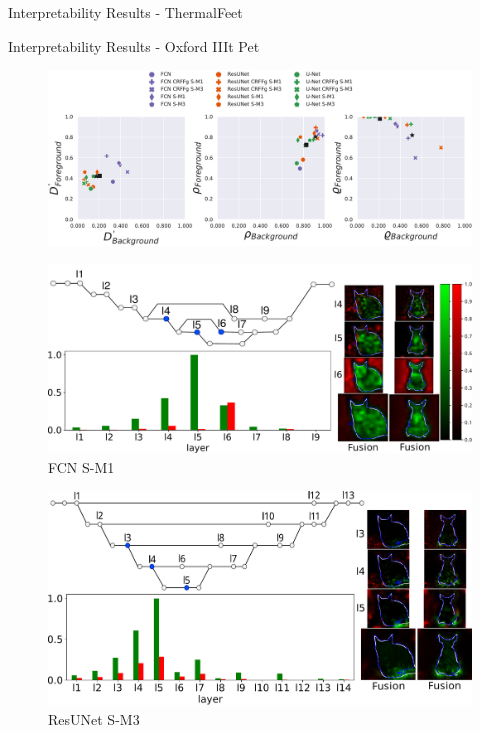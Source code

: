 \documentclass[aspectratio=169]{beamer}
\begin{document}
\begin{frame}[allowframebreaks]{Interpretability Results - ThermalFeet}
\end{frame}






\begin{frame}[allowframebreaks]{Interpretability Results - Oxford IIIt Pet}

\begin{figure}
        \centering
        \includegraphics[width=1\linewidth]{Figures/oxford_metrics.pdf}

\end{figure}


\framebreak
\begin{figure}[htbp]
  \centering
  \includegraphics[width=0.8\linewidth]{Figures/oxford_fcn_best.pdf}
  \caption{FCN S-M1}
\end{figure}

\framebreak
\begin{figure}[htbp]
  \centering
  \includegraphics[width=0.7\linewidth]{Figures/oxford_res_best.pdf}
  \caption{ResUNet S-M3}
\end{figure}



\end{frame}
\end{document}
